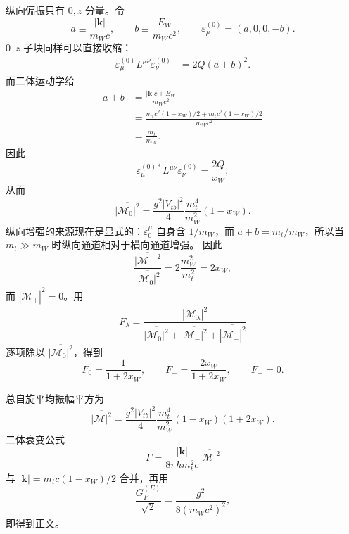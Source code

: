 \begin{derivation}
纵向偏振只有 $0,z$ 分量。令
\begin{equation*}
 a\equiv\frac{|\mathbf k|}{m_Wc},
 \qquad
 b\equiv\frac{E_W}{m_Wc^2},
 \qquad
 \varepsilon_{\mu}^{(0)}=(a,0,0,-b).
\end{equation*}
$0$--$z$ 子块同样可以直接收缩：
\begin{align*}
\varepsilon_{\mu}^{(0)}L^{\mu\nu}\varepsilon_{\nu}^{(0)}
&=2Q(a+b)^2.
\end{align*}
而二体运动学给
\begin{align*}
 a+b
&=\frac{|\mathbf k|c+E_W}{m_Wc^2}\\
&=\frac{m_tc^2(1-x_W)/2+m_tc^2(1+x_W)/2}{m_Wc^2}\\
&=\frac{m_t}{m_W}.
\end{align*}
因此
\begin{equation*}
\varepsilon_{\mu}^{(0)*}L^{\mu\nu}\varepsilon_{\nu}^{(0)}
=\frac{2Q}{x_W},
\end{equation*}
从而
\begin{equation*}
 \boxed{
 \overline{|\mathcal M_0|^2}
 =\frac{g^2|V_{tb}|^2}{4}
 \frac{m_t^4}{m_W^2}(1-x_W)}.
\end{equation*}
纵向增强的来源现在是显式的：$\varepsilon_0^\mu$ 自身含 $1/m_W$，而 $a+b=m_t/m_W$，所以当 $m_t\gg m_W$ 时纵向通道相对于横向通道增强。
因此
\begin{equation*}
 \frac{\overline{|\mathcal M_-|^2}}
 {\overline{|\mathcal M_0|^2}}
 =2\frac{m_W^2}{m_t^2}=2x_W,
\end{equation*}
而 $\overline{|\mathcal M_+|^2}=0$。用
\begin{equation*}
F_\lambda
=\frac{\overline{|\mathcal M_\lambda|^2}}
{\overline{|\mathcal M_0|^2}+\overline{|\mathcal M_-|^2}+\overline{|\mathcal M_+|^2}}
\end{equation*}
逐项除以 $\overline{|\mathcal M_0|^2}$，得到
\begin{equation*}
 F_0=\frac1{1+2x_W},
 \qquad
 F_-=\frac{2x_W}{1+2x_W},
 \qquad
 F_+=0.
\end{equation*}

总自旋平均振幅平方为
\begin{equation*}
 \overline{|\mathcal M|^2}
 =\frac{g^2|V_{tb}|^2}{4}
 \frac{m_t^4}{m_W^2}(1-x_W)(1+2x_W).
\end{equation*}
二体衰变公式
\begin{equation*}
 \Gamma
 =\frac{|\mathbf k|}{8\pi\hbar m_t^2c}
 \overline{|\mathcal M|^2}
\end{equation*}
与 $|\mathbf k|=m_tc(1-x_W)/2$ 合并，再用
\begin{equation*}
 \frac{G_F^{(E)}}{\sqrt2}=\frac{g^2}{8(m_Wc^2)^2},
\end{equation*}
即得到正文。
\end{derivation}
